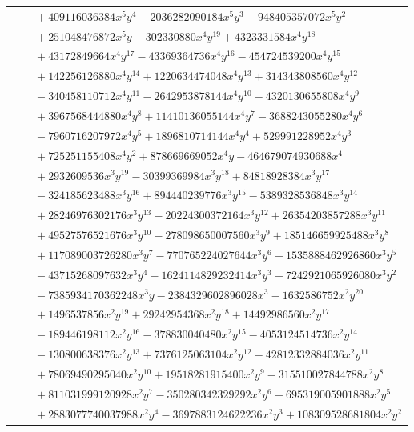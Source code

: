 \documentclass[11pt]{article}
\begin{document}
\begin{longtable}{@{}ll@{}}
 & $\quad +409116036384x^{5}y^{4}-2036282090184x^{5}y^{3}-948405357072x^{5}y^{2}$\\
 & $\quad +251048476872x^{5}y-302330880x^{4}y^{19}+4323331584x^{4}y^{18}$\\
 & $\quad +43172849664x^{4}y^{17}-43369364736x^{4}y^{16}-454724539200x^{4}y^{15}$\\
 & $\quad +142256126880x^{4}y^{14}+1220634474048x^{4}y^{13}+314343808560x^{4}y^{12}$\\
 & $\quad -340458110712x^{4}y^{11}-2642953878144x^{4}y^{10}-4320130655808x^{4}y^{9}$\\
 & $\quad +3967568444880x^{4}y^{8}+11410136055144x^{4}y^{7}-3688243055280x^{4}y^{6}$\\
 & $\quad -7960716207972x^{4}y^{5}+1896810714144x^{4}y^{4}+529991228952x^{4}y^{3}$\\
 & $\quad +725251155408x^{4}y^{2}+878669669052x^{4}y-464679074930688x^{4}$\\
 & $\quad +2932609536x^{3}y^{19}-30399369984x^{3}y^{18}+84818928384x^{3}y^{17}$\\
 & $\quad -324185623488x^{3}y^{16}+894440239776x^{3}y^{15}-5389328536848x^{3}y^{14}$\\
 & $\quad +28246976302176x^{3}y^{13}-20224300372164x^{3}y^{12}+26354203857288x^{3}y^{11}$\\
 & $\quad +49527576521676x^{3}y^{10}-278098650007560x^{3}y^{9}+185146659925488x^{3}y^{8}$\\
 & $\quad +117089003726280x^{3}y^{7}-770765224027644x^{3}y^{6}+1535888462926860x^{3}y^{5}$\\
 & $\quad -43715268097632x^{3}y^{4}-1624114829232414x^{3}y^{3}+7242921065926080x^{3}y^{2}$\\
 & $\quad -7385934170362248x^{3}y-2384329602896028x^{3}-1632586752x^{2}y^{20}$\\
 & $\quad +1496537856x^{2}y^{19}+29242954368x^{2}y^{18}+14492986560x^{2}y^{17}$\\
 & $\quad -189446198112x^{2}y^{16}-378830040480x^{2}y^{15}-4053124514736x^{2}y^{14}$\\
 & $\quad -130800638376x^{2}y^{13}+7376125063104x^{2}y^{12}-42812332884036x^{2}y^{11}$\\
 & $\quad +78069490295040x^{2}y^{10}+19518281915400x^{2}y^{9}-315510027844788x^{2}y^{8}$\\
 & $\quad +811031999120928x^{2}y^{7}-350280342329292x^{2}y^{6}-695319005901888x^{2}y^{5}$\\
 & $\quad +2883077740037988x^{2}y^{4}-3697883124622236x^{2}y^{3}+108309528681804x^{2}y^{2}$\\

\end{longtable}
\end{document}
